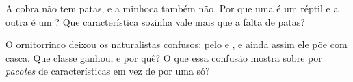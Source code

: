 \begin{exercise}[$\star\star$]\label{exo:g4:classifying-animals:10}
A cobra não tem patas, e a minhoca também não. Por que uma é um
réptil  e a outra é um ? Que característica
sozinha vale mais que a falta de patas?
\end{exercise}

\begin{exercise}[$\star\star\star$]\label{exo:g4:classifying-animals:11}
O ornitorrinco deixou os naturalistas confusos: pelo e , e
ainda assim ele põe  com casca. Que classe ganhou, e por quê? O
que essa confusão mostra sobre  por \emph{pacotes} de
características em vez de por uma só?
\end{exercise}
